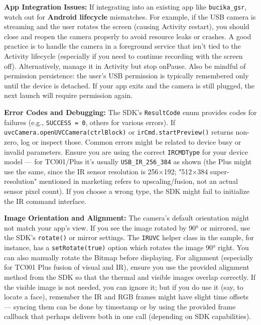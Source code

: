 {\item \textbf{App Integration Issues:} If integrating into an existing app like
  \texttt{bucika_gsr}, watch out for \textbf{Android lifecycle} mismatches. For
  example, if the USB camera is streaming and the user rotates the
  screen (causing Activity restart), you should close and reopen the
  camera properly to avoid resource leaks or crashes. A good practice is
  to handle the camera in a foreground service that isn't tied to the
  Activity lifecycle (especially if you need to continue recording with
  the screen off). Alternatively, manage it in Activity but stop
  onPause. Also be mindful of permission persistence: the user's USB
  permission is typically remembered only until the device is detached.
  If your app exits and the camera is still plugged, the next launch
  will require permission again.

\item \textbf{Error Codes and Debugging:} The SDK's \texttt{ResultCode} enum provides
  codes for failures (e.g., \texttt{SUCCESS = 0}, others for various errors).
  If \texttt{uvcCamera.openUVCCamera(ctrlBlock)} or \texttt{irCmd.startPreview()}
  returns non-zero, log or inspect those. Common errors might be related
  to device busy or invalid parameters. Ensure you are using the correct
  \texttt{IRCMDType} for your device model --- for TC001/Plus it's usually
  \texttt{USB_IR_256_384} as shown (the Plus might use the same, since the IR
  sensor resolution is 256×192; "512×384 super-resolution" mentioned in
  marketing refers to upscaling/fusion, not an actual sensor pixel
  count). If you choose a wrong type, the SDK might fail to initialize
  the IR command interface.

\item \textbf{Image Orientation and Alignment:} The camera's default orientation
  might not match your app's view. If you see the image rotated by 90°
  or mirrored, use the SDK's \texttt{rotate()} or mirror settings. The \texttt{IRUVC}
  helper class in the sample, for instance, has a \texttt{setRotate(true)}
  option which rotates the image 90°
  right\cite{ref43}.
  You can also manually rotate the Bitmap before displaying. For
  alignment (especially for TC001 Plus fusion of visual and IR), ensure
  you use the provided alignment method from the SDK so that the thermal
  and visible images overlap correctly. If the visible image is not
  needed, you can ignore it; but if you do use it (say, to locate a
  face), remember the IR and RGB frames might have slight time offsets
  --- syncing them can be done by timestamp or by using the provided
  frame callback that perhaps delivers both in one call (depending on
  SDK capabilities).

}
